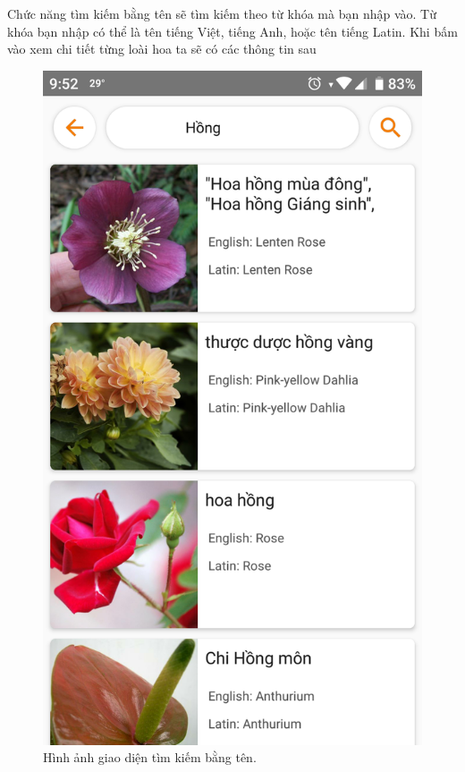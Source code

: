 \documentclass[12pt]{report}
\begin{document}
		\newpage
		Chức năng tìm kiếm bằng tên sẽ tìm kiếm theo từ khóa mà bạn nhập vào. Từ khóa bạn nhập có thể là tên tiếng Việt, tiếng Anh, hoặc tên tiếng Latin.
		Khi bấm vào xem chi tiết từng loài hoa ta sẽ có các thông tin sau
		\begin{figure}[h]
			\centering
			\includegraphics[scale=0.2]{app_search_name}
			\caption{Hình ảnh giao diện tìm kiếm bằng tên.}
			\label{fig:app_search_name}
		\end{figure}
						
\end{document}
